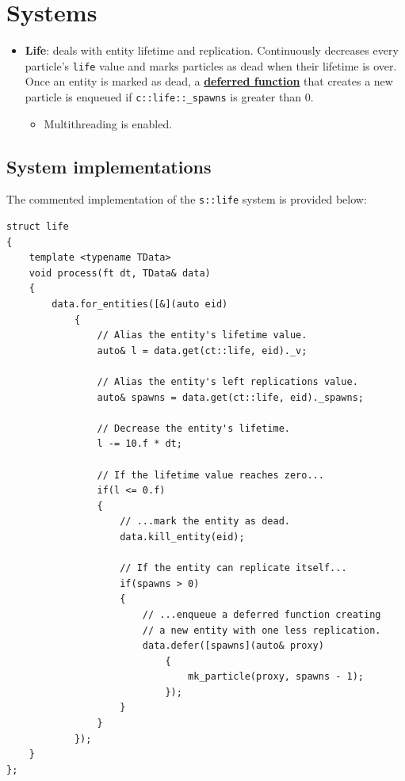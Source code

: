 \documentclass[oneside, 12pt, a4paper, openany]{book}
\providecommand{\tightlist}{%
  \setlength{\itemsep}{0pt}\setlength{\parskip}{0pt}}
\begin{document}
\section{Systems}\label{systems-1}

\begin{itemize}
\item
  \textbf{Life}: deals with entity lifetime and replication.
  Continuously decreases every particle's
  \texttt{life}
  value and marks particles as dead when their lifetime is over. Once an
  entity is marked as dead, a
  \protect\hyperlink{flow_exec_dfuncs}{\textbf{deferred function}} that
  creates a new particle is enqueued if
  \texttt{c::life::_spawns}
  is greater than \(0\).

  \begin{itemize}
  \tightlist
  \item
    Multithreading is enabled.
  \end{itemize}
\end{itemize}

\subsection{System implementations}\label{system-implementations-1}

The commented implementation of the
\texttt{s::life}
system is provided below:

\begin{verbatim}
struct life
{
    template <typename TData>
    void process(ft dt, TData& data)
    {
        data.for_entities([&](auto eid)
            {
                // Alias the entity's lifetime value.
                auto& l = data.get(ct::life, eid)._v;

                // Alias the entity's left replications value.
                auto& spawns = data.get(ct::life, eid)._spawns;

                // Decrease the entity's lifetime.
                l -= 10.f * dt;

                // If the lifetime value reaches zero...
                if(l <= 0.f)
                {
                    // ...mark the entity as dead.
                    data.kill_entity(eid);

                    // If the entity can replicate itself...
                    if(spawns > 0)
                    {
                        // ...enqueue a deferred function creating
                        // a new entity with one less replication.
                        data.defer([spawns](auto& proxy)
                            {
                                mk_particle(proxy, spawns - 1);
                            });
                    }
                }
            });
    }
};
\end{verbatim}
\end{document}
